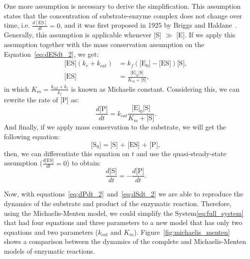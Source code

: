 One more assumption is necessary to derive the simplification. This 
assumption states that the concentration of substrate-enzyme complex
does not change over time, i.e. $\frac{d[\text{ES}]}{dt} = 0$, and it 
was first proposed in 1925 by Briggs and Haldane~\cite{Briggs1925}. 
Generally, this assumption is applicable whenever [S] $\gg$ [E]. 
If we apply this assumption together with the mass conservation 
assumption on the Equation~\ref{eq:dESdt_2}, we get:
\begin{equation*}  
    \begin{aligned}
        \text{[ES]} (k_r + k_{cat}) &= 
            k_f(\text{[E$_0$]} - \text{[ES]})\text{[S]}, \\
        \text{[ES]} &= \frac{\text{[E]}_0\text{[S]}}{K_m + \text{[S]}}, 
    \end{aligned}
\end{equation*}
in which $K_m = \frac{k_{cat} + k_r}{k_f}$ is known as Michaelis 
constant. Considering this, we can rewrite the rate of [P] as:
\begin{equation}
    \frac{d\text{[P]}}{dt} = k_{cat}\frac{\text{[E]}_0\text{[S]}}
        {K_m + \text{[S]}}.
    \label{eq:dPdt_2}
\end{equation}
And finally, if we apply mass conservation to the substrate, we will get
the following equation:
\begin{equation*}
    \text{[S$_0$]} = \text{[S] + [ES] + [P]},
\end{equation*}
then, we can differentiate this equation on $t$ and use the 
quasi-steady-state assumption ($\frac{d\text{[ES]}}{dt} = 0$) to obtain:
\begin{equation}
    \frac{d\text{[S]}}{dt} = - \frac{d\text{[P]}}{dt}.
    \label{eq:dSdt_2}
\end{equation}

Now, with equations~\ref{eq:dPdt_2}~and~\ref{eq:dSdt_2} we are able to
reproduce the dynamics of the substrate and product of the enzymatic 
reaction. Therefore, using the Michaelis-Menten model, we could simplify 
the System\ref{eq:full_system} that had four equations and three 
parameters to a new model that has only two equations and two parameters 
($k_{cat}$ and $K_m$). Figure~\ref{fig:michaelis_menten} shows a 
comparison between the dynamics of the complete and Michaelis-Menten 
models of enzymatic reactions.

